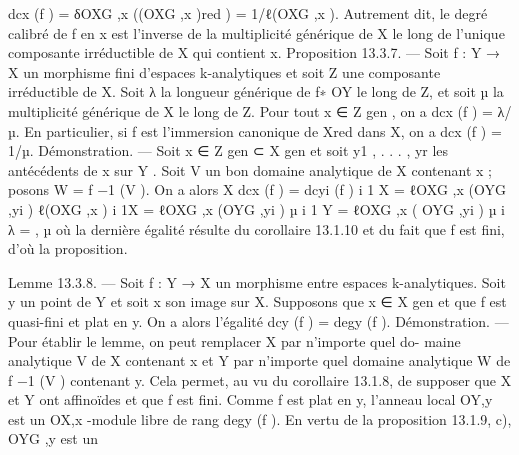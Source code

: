 \documentclass[
  10pt,
]{article}
\newenvironment{Shaded}{}{}
\newcommand{\NormalTok}[1]{#1}
\begin{document}
\begin{Shaded}
\begin{Highlighting}[]
\NormalTok{                        dcx (f ) = δOXG ,x ((OXG ,x )red ) = 1/ℓ(OXG ,x ).}
\NormalTok{Autrement dit, le degré calibré de f en x est l’inverse de la multiplicité générique de X}
\NormalTok{le long de l’unique composante irréductible de X qui contient x.}
\NormalTok{Proposition 13.3.7. — Soit f : Y → X un morphisme fini d’espaces k{-}analytiques et}
\NormalTok{soit Z une composante irréductible de X. Soit λ la longueur générique de f∗ OY le long}
\NormalTok{de Z, et soit µ la multiplicité générique de X le long de Z. Pour tout x ∈ Z gen , on a}
\NormalTok{dcx (f ) = λ/µ.}
\NormalTok{  En particulier, si f est l’immersion canonique de Xred dans X, on a dcx (f ) = 1/µ.}
\NormalTok{Démonstration. — Soit x ∈ Z gen ⊂ X gen et soit y1 , . . . , yr les antécédents de x sur Y .}
\NormalTok{Soit V un bon domaine analytique de X contenant x ; posons W = f −1 (V ). On a alors}
\NormalTok{                                  X}
\NormalTok{                       dcx (f ) =   dcyi (f )}
\NormalTok{                                        i}
\NormalTok{                                             1   X}
\NormalTok{                                   =               ℓOXG ,x (OYG ,yi )}
\NormalTok{                                     ℓ(OXG ,x ) i}
\NormalTok{                                     1X}
\NormalTok{                                   =      ℓOXG ,x (OYG ,yi )}
\NormalTok{                                     µ i}
\NormalTok{                                     1         Y}
\NormalTok{                                   = ℓOXG ,x ( OYG ,yi )}
\NormalTok{                                     µ          i}
\NormalTok{                                       λ}
\NormalTok{                                   =     ,}
\NormalTok{                                       µ}
\NormalTok{où la dernière égalité résulte du corollaire 13.1.10 et du fait que f est fini, d’où la}
\NormalTok{proposition.}

\NormalTok{Lemme 13.3.8. — Soit f : Y → X un morphisme entre espaces k{-}analytiques. Soit y}
\NormalTok{un point de Y et soit x son image sur X. Supposons que x ∈ X gen et que f est quasi{-}fini}
\NormalTok{et plat en y. On a alors l’égalité dcy (f ) = degy (f ).}
\NormalTok{Démonstration. — Pour établir le lemme, on peut remplacer X par n’importe quel do{-}}
\NormalTok{maine analytique V de X contenant x et Y par n’importe quel domaine analytique W}
\NormalTok{de f −1 (V ) contenant y. Cela permet, au vu du corollaire 13.1.8, de supposer que X et}
\NormalTok{Y ont affinoïdes et que f est fini. Comme f est plat en y, l’anneau local OY,y est un}
\NormalTok{OX,x {-}module libre de rang degy (f ). En vertu de la proposition 13.1.9, c), OYG ,y est un}
\end{Highlighting}
\end{Shaded}
\end{document}
